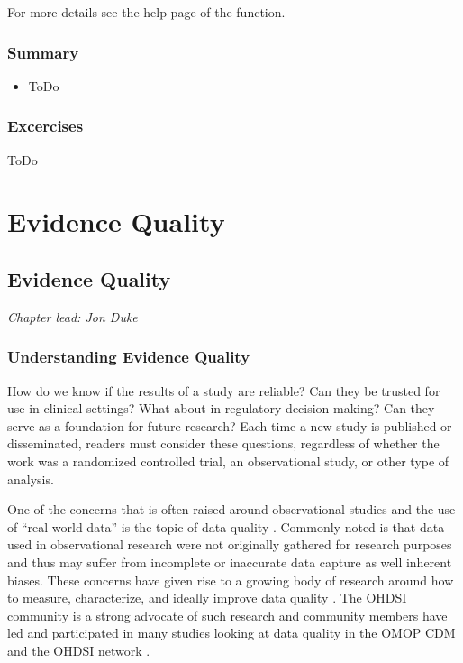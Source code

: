 \documentclass[11pt]{book}
\providecommand{\tightlist}{%
  \setlength{\itemsep}{0pt}\setlength{\parskip}{0pt}}
\theoremstyle{definition}
\theoremstyle{definition}
\theoremstyle{definition}
\theoremstyle{remark}
\let\BeginKnitrBlock\begin \let\EndKnitrBlock\end
\begin{document}
For more details see the help page of the function.

\hypertarget{summary-8}{%
\section{Summary}\label{summary-8}}

\BeginKnitrBlock{rmdsummary}
\begin{itemize}
\tightlist
\item
  ToDo
\end{itemize}
\EndKnitrBlock{rmdsummary}

\hypertarget{excercises-1}{%
\section{Excercises}\label{excercises-1}}

ToDo

\hypertarget{part-evidence-quality}{%
\part{Evidence Quality}\label{part-evidence-quality}}

\hypertarget{EvidenceQuality}{%
\chapter{Evidence Quality}\label{EvidenceQuality}}

\emph{Chapter lead: Jon Duke}

\hypertarget{understanding-evidence-quality}{%
\section{Understanding Evidence Quality}\label{understanding-evidence-quality}}

How do we know if the results of a study are reliable? Can they be trusted for use in clinical settings? What about in regulatory decision-making? Can they serve as a foundation for future research? Each time a new study is published or disseminated, readers must consider these questions, regardless of whether the work was a randomized controlled trial, an observational study, or other type of analysis.

One of the concerns that is often raised around observational studies and the use of ``real world data'' is the topic of data quality \citep{botsis2010secondary, hersh2013caveats, sherman2016real}. Commonly noted is that data used in observational research were not originally gathered for research purposes and thus may suffer from incomplete or inaccurate data capture as well inherent biases. These concerns have given rise to a growing body of research around how to measure, characterize, and ideally improve data quality \citep{kahn2012pragmatic, liaw2013towards, weiskopf2013methods}. The OHDSI community is a strong advocate of such research and community members have led and participated in many studies looking at data quality in the OMOP CDM and the OHDSI network \citep{huser_multisite_2016, kahn_transparent_2015, callahan2017comparison, yoon_2016}.
\end{document}
